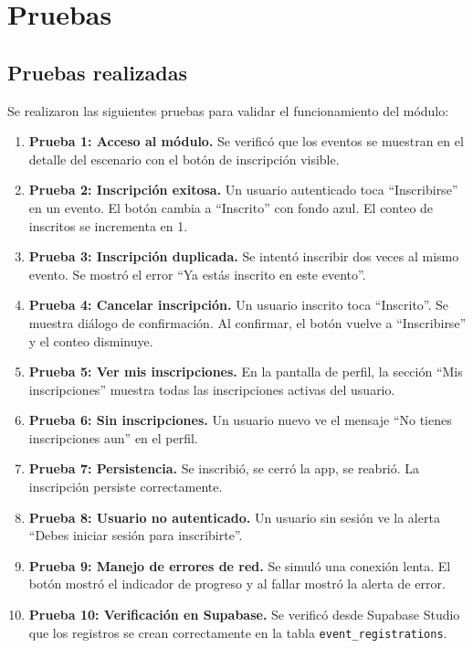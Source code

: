 \documentclass[12pt,letterpaper]{article}
\begin{document}
\section{Pruebas}

\subsection{Pruebas realizadas}

Se realizaron las siguientes pruebas para validar el funcionamiento
del m\'odulo:

\begin{enumerate}
  \item \textbf{Prueba 1: Acceso al m\'odulo.} Se verific\'o que
    los eventos se muestran en el detalle del escenario con el bot\'on
    de inscripci\'on visible.

  \item \textbf{Prueba 2: Inscripci\'on exitosa.} Un usuario
    autenticado toca ``Inscribirse'' en un evento. El bot\'on cambia
    a ``Inscrito'' con fondo azul. El conteo de inscritos se
    incrementa en 1.

  \item \textbf{Prueba 3: Inscripci\'on duplicada.} Se intent\'o
    inscribir dos veces al mismo evento. Se mostr\'o el error
    ``Ya est\'as inscrito en este evento''.

  \item \textbf{Prueba 4: Cancelar inscripci\'on.} Un usuario
    inscrito toca ``Inscrito''. Se muestra di\'alogo de
    confirmaci\'on. Al confirmar, el bot\'on vuelve a
    ``Inscribirse'' y el conteo disminuye.

  \item \textbf{Prueba 5: Ver mis inscripciones.} En la pantalla
    de perfil, la secci\'on ``Mis inscripciones'' muestra todas las
    inscripciones activas del usuario.

  \item \textbf{Prueba 6: Sin inscripciones.} Un usuario nuevo
    ve el mensaje ``No tienes inscripciones aun'' en el perfil.

  \item \textbf{Prueba 7: Persistencia.} Se inscribi\'o, se cerr\'o
    la app, se reabri\'o. La inscripci\'on persiste correctamente.

  \item \textbf{Prueba 8: Usuario no autenticado.} Un usuario sin
    sesi\'on ve la alerta ``Debes iniciar sesi\'on para
    inscribirte''.

  \item \textbf{Prueba 9: Manejo de errores de red.} Se simul\'o
    una conexi\'on lenta. El bot\'on mostr\'o el indicador de
    progreso y al fallar mostr\'o la alerta de error.

  \item \textbf{Prueba 10: Verificaci\'on en Supabase.} Se
    verific\'o desde Supabase Studio que los registros se crean
    correctamente en la tabla \texttt{event\_registrations}.
\end{enumerate}
\end{document}
